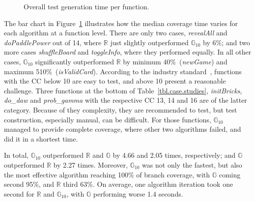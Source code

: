 \documentclass[sigconf,review, anonymous]{acmart}
\newcommand{\Random}{\mathbb{R}}
\newcommand{\Genetic}{\mathbb{G}}
\newcommand{\RGenetic}{\mathbb{G}_{10}}
\begin{document}
\begin{figure}[t]
  \caption{Overall test generation time per function.}
  \label{fig.gen.time.comp}
\end{figure}  

The bar chart in Figure~\ref{fig.gen.time.comp} illustrates how the median coverage time varies for each algorithm at a function level. There are only two cases, \emph{revealAll} and \emph{doPaddlePower} out of 14, where $\Random$ just slightly outperformed $\RGenetic$ by 6\%; and two more cases \emph{shuffleBoard} and \emph{toggleInfo}, where they performed equally. In all other cases, $\RGenetic$ significantly outperformed $\Random$ by minimum 40\%~(\emph{newGame}) and maximum 510\%~(\emph{isValidCard}). According to the industry standard~\cite{bray1997c4}, functions with the CC below 10 are easy to test, and above 10 present a reasonable challenge. Three functions at the bottom of Table~\ref{tbl.case.studies}, \emph{initBricks}, \emph{do_daw} and \emph{prob_gamma} with the respective CC 13, 14 and 16 are of the latter category. Because of they complexity, they are recommended to test, but test construction, especially manual, can be difficult. For those functions, $\RGenetic$ managed to provide complete coverage, where other two algorithms failed, and did it in a shortest time.

In total, $\RGenetic$ outperformed $\Random$ and $\Genetic$ by 4.66 and 2.05 times, respectively; and $\Genetic$ outperformed $\Random$ by 2.27 times. Moreover, $\RGenetic$ was not only the fastest, but also the most effective algorithm reaching 100\% of branch coverage, with $\Genetic$ coming second 95\%, and $\Random$ third 63\%. On average, one algorithm iteration took one second for $\Random$ and $\RGenetic$, with $\Genetic$ performing worse 1.4 seconds. 
\end{document}
